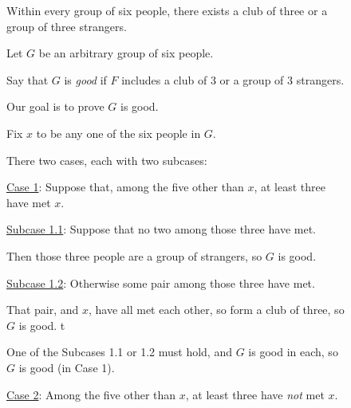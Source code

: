 \begin{figure}
\begin{framed}
\begin{theorem}
  Within every group of six people, there exists a club of three or a group of three strangers.
\end{theorem}
\begin{longFormProof}\small
  \step Let $G$ be an arbitrary group of six people.

  \step Say that $G$ is \emph{good} if $F$ includes a club of 3 or a group of 3 strangers. 

  \step Our goal is to prove $G$ is good.

  \step Fix $x$ to be any one of the six people in $G$.

  \step There two cases, each with two subcases:

  \begin{block}[proofs: C1]
    \step[proofs: C11] \underline{Case 1}: Suppose that, among the five other than $x$,
    at least three have met $x$.

    \begin{block}[proofs: C1A]
      \step \underline{Subcase 1.1}: Suppose that no two among those three have met. 

      \step Then those three people are a group of strangers, so $G$ is good.
    \end{block}
    \begin{block}[proofs: C1B]
      \step \underline{Subcase 1.2}: Otherwise some pair among those three have met. 

      \step That pair, and $x$, have all met each other, so form a club of three, so $G$ is good.
      t

    \end{block}
    \step One of the Subcases 1.1 or 1.2 must hold, and $G$ is good in each, so $G$ is good (in Case 1). 
  \end{block}

  \begin{block}[proofs: C2]
    \step \underline{Case 2}:  Among the five other than $x$,
    at least three have \emph{not} met $x$.


\end{block}
\end{longFormProof}
\end{framed}
\end{figure}
